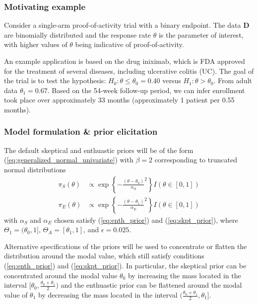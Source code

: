 \documentclass[12pt]{article}
\begin{document}
\subsubsection{Motivating example}
Consider a single-arm proof-of-activity trial with a binary endpoint. The data $\mathbf{D}$ are binomially distributed and the response rate $\theta$ is the parameter of interest, with higher values of $\theta$ being indicative of proof-of-activity. 

An example application is based on the drug iniximab, which is FDA approved for the treatment of several diseases, including ulcerative colitis (UC). The goal of the trial is to test the hypothesis: $H_0:\theta\leq\theta_0=0.40$ versus $H_1:\theta>\theta_0$. From adult data $\theta_1=0.67$. Based on the 54-week follow-up period, we can infer enrollment took place over approximately 33 months (approximately 1 patient per 0.55 months).

\subsubsection{Model formulation \& prior elicitation}
The default skeptical and enthuastic priors will be of the form (\ref{eq:generalized_normal_univariate}) with $\beta=2$ corresponding to truncated normal distributions
\begin{align*}
\pi_S(\theta)&\propto \exp\left\{-\frac{(\theta-\theta_0)}{\alpha_S}^2\right\} I(\theta\in[0,1])\\
\pi_E(\theta)&\propto \exp\left\{-\frac{(\theta-\theta_1)}{\alpha_E}^2\right\} I(\theta\in[0,1])
\end{align*}
with $\alpha_S$ and $\alpha_E$ chosen satisfy (\ref{eq:enth_prior}) and (\ref{eq:skpt_prior}), where $\Theta_1=(\theta_0,1]$, $\Theta_A=[\theta_1,1]$, and $\epsilon=0.025$.

Alternative specifications of the priors will be used to concentrate or flatten the distribution around the modal value, which still satisfy conditions (\ref{eq:enth_prior}) and (\ref{eq:skpt_prior}). In particular, the skeptical prior can be concentrated around the modal value $\theta_0$ by increasing the mass located in the interval $[\theta_0,\frac{\theta_0+\theta_1}{2})$ and the enthuastic prior can be flattened around the modal value of $\theta_1$ by decreasing the mass located in the interval $(\frac{\theta_0+\theta_1}{2},\theta_1]$.
\end{document}
